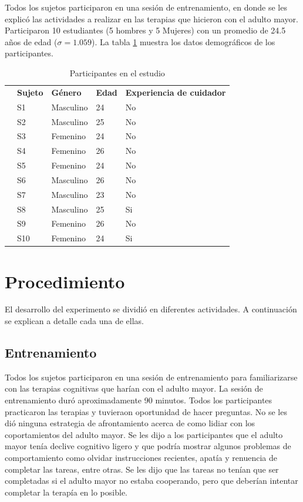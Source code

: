Todos los sujetos participaron en una sesi\'on de entrenamiento, en donde se les explic\'o las actividades a realizar en las terapias que hicieron con el adulto mayor.
Participaron 10 estudiantes (5 hombres y 5 Mujeres) con un promedio de 24.5 a\~nos de edad ($\sigma=1.059$). La tabla \ref{table:kysymys} muestra los datos demogr\'aficos de los participantes.
\begin{table}
	\footnotesize
	\centering
	\caption{Participantes en el estudio}
	\label{table:kysymys}
	\begin{tabular}{m{0.2cm}m{2.5cm}m{2.5cm}m{2.5cm}m{2.5cm}}
		\hline\noalign{\smallskip}
		 & \textbf{Sujeto} & \textbf{G\'enero} & \textbf{Edad} & \textbf{Experiencia de cuidador}
		\\ \noalign{\smallskip}
		\hline
		\noalign{\smallskip}
		&S1& Masculino & 24 & No   \\ 
		&S2& Masculino &  25&  No  \\ 
		&S3& Femenino & 24 & No   \\ 
		&S4& Femenino & 26 & No  \\ 
		&S5& Femenino & 24 & No   \\ 
		&S6& Masculino & 26 &  No  \\ 
		&S7& Masculino & 23 &  No \\ 
		&S8& Masculino & 25 &  Si  \\ 
		&S9& Femenino & 26 & No   \\ 
	  	&S10& Femenino & 24 & Si  \\ 
		\hline
	\end{tabular}
\end{table}
\section{Procedimiento}\label{secc:methods}
El desarrollo del experimento se dividi\'o en diferentes actividades. A continuaci\'on se explican a detalle cada una de ellas.
\subsection{Entrenamiento}\label{secc:training}
Todos los sujetos participaron en una sesi\'on de entrenamiento para familiarizarse con las terapias cognitivas que har\'ian con el adulto mayor. La sesi\'on de entrenamiento dur\'o aproximadamente 90 minutos. Todos los participantes practicaron las terapias y tuvieraon oportunidad de hacer preguntas. No se les di\'o ninguna estrategia de afrontamiento acerca de como lidiar con los coportamientos del adulto mayor. Se les dijo a los participantes que el adulto mayor ten\'ia declive cognitivo ligero y que podr\'ia mostrar algunos problemas de comportamiento como olvidar instrucciones recientes, apat\'ia y renuencia de completar las tareas, entre otras. Se les dijo que las tareas no ten\'ian que ser completadas si el adulto mayor no estaba cooperando, pero que deber\'ian intentar completar la terap\'ia en lo posible.

